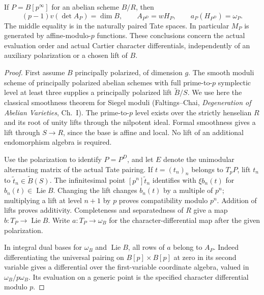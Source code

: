 \begin{theorem}
\label{thm:geometry-good-abelian-additive}
If \(P=B[p^\infty]\) for an abelian scheme \(B/R\), then
\[
 (p-1)v(\det A_P)=\dim B,\qquad
 A_{P^D}=wH_P,\qquad a_P(H_{P^D})=\omega_P.             \tag{AL1}
\]
The middle equality is in the naturally paired Tate spaces.
In particular \(M_P\) is generated by affine-modulo-\(p\) functions.
These conclusions concern the actual evaluation order and actual
Cartier character differentials, independently of an auxiliary
polarization or a chosen lift of \(B\).
\end{theorem}
\begin{proof}
First assume \(B\) principally polarized, of dimension \(g\).
The smooth moduli scheme of principally polarized abelian schemes
with full prime-to-\(p\) symplectic level at least three supplies a
principally polarized lift \(\widetilde B/S\). We use here the
classical smoothness theorem for Siegel moduli (Faltings--Chai,
\emph{Degeneration of Abelian Varieties}, Ch.~I).
The prime-to-\(p\) level exists over the strictly henselian \(R\)
and its root of unity lifts through the nilpotent ideal.
Formal smoothness gives a lift through \(S\to R\), since the base is
affine and local. No lift of an additional endomorphism algebra is
required.

Use the polarization to identify \(P=P^D\), and let
\(E\) denote the unimodular alternating matrix of the actual
Tate pairing. If \(t=(t_n)_n\) belongs to \(T_pP\), lift
\(t_n\) to \(\widetilde t_n\in\widetilde B(S)\).
The infinitesimal point
\([p^n]\widetilde t_n\) identifies with \(\xi b_n(t)\)
for \(b_n(t)\in\operatorname{Lie}B\).
Changing the lift changes \(b_n(t)\) by a multiple of \(p^n\);
multiplying a lift at level \(n+1\) by \(p\) proves compatibility
modulo \(p^n\). Addition of lifts proves additivity. Completeness
and separatedness of \(R\) give a map
\(b:T_P\to\operatorname{Lie}B\).
Write \(a:T_P\to\omega_B\) for the character-differential map
after the given polarization.

In integral dual bases for \(\omega_B\) and \(\operatorname{Lie}B\),
all rows of \(a\) belong to \(A_P\). Indeed differentiating the
universal pairing on \(B[p]\times B[p]\) at zero in its second
variable gives a differential over the first-variable coordinate
algebra, valued in \(\omega_B/p\omega_B\).
Its evaluation on a generic point is the specified character
differential modulo \(p\).


\end{proof}
